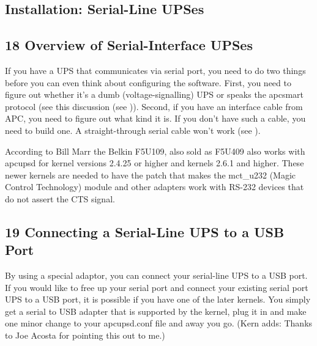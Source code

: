 \label{Installation-on-Serial_002dLine-UPSes}

\subsection*{Installation: Serial-Line UPSes}

\label{Overview-of-Serial_002dInterface-UPSes}

\subsection*{18 Overview of Serial-Interface UPSes}

\label{index-Serial-UPSes-189}
If you have a UPS that communicates via serial port, you need to do two things
before you can even think about configuring the software. First, you need to
figure out whether it's a dumb (voltage-signalling) UPS or speaks the apcsmart
protocol (see this discussion (see 
)).  Second, if you have an interface
cable from APC, you need to figure out what kind it is.  If you don't have
such a cable, you need to build one.  A straight-through serial cable won't
work (see 
).  

According to Bill Marr the Belkin F5U109, also sold as F5U409 also works with
apcupsd for kernel versions 2.4.25 or higher and kernels 2.6.1 and higher. 
These newer kernels are needed to have the patch that makes the mct\_u232
(Magic Control Technology) module and other adapters work with RS-232 devices
that do not assert the CTS signal. 

\label{Connecting-a-Serial_002dLine-UPS-to-a-USB-Port}

\subsection*{19 Connecting a Serial-Line UPS to a USB Port}

\label{index-Serial-on-USB-190}
By using a special adaptor, you can connect your serial-line UPS to a USB
port. If you would like to free up your serial port and connect your existing
serial port UPS to a USB port, it is possible if you have one of the later
kernels. You simply get a serial to USB adapter that is supported by the
kernel, plug it in and make one minor change to your apcupsd.conf file and
away you go. (Kern adds: Thanks to Joe Acosta for pointing this out to me.)  

